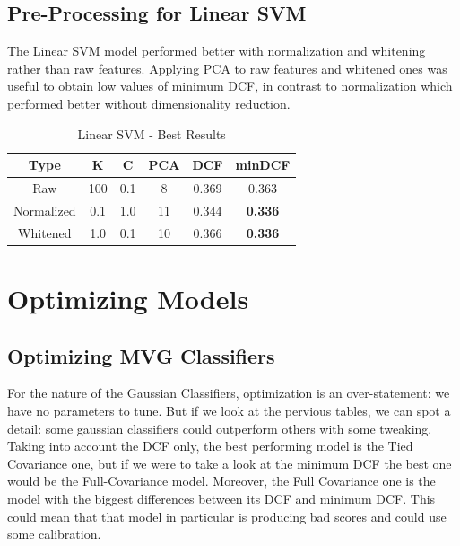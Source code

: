 \documentclass[12pt, twocolumn]{article}
\begin{document}
\subsection{Pre-Processing for Linear SVM}

The Linear SVM model performed better with normalization and whitening rather than raw features.
Applying PCA to raw features and whitened ones was useful to obtain low values of minimum DCF, in
contrast to normalization which performed better without dimensionality reduction.

\begin{table}[H]
    \centering
        \begin{tabular}{||c|c|c|c|c|c||}
            \hline
            Type & K & C & PCA & DCF & minDCF \\
            \hline
            \hline
            Raw & 100 & 0.1 & 8 & 0.369 &  0.363  \\
            Normalized & 0.1 & 1.0 & 11 & 0.344 &  {\bf 0.336}  \\
            Whitened & 1.0 & 0.1 & 10 & 0.366 &  {\bf 0.336}  \\
            \hline
    \end{tabular}
    \caption{Linear SVM - Best Results}
\end{table}

\section{Optimizing Models}
\subsection{Optimizing MVG Classifiers}

For the nature of the Gaussian Classifiers, optimization is an over-statement: we have no parameters to tune. 
But if we look at the pervious tables, we can spot a detail: some gaussian classifiers could outperform others with some tweaking.
Taking into account the DCF only, the best performing model is the Tied Covariance one, but if we were to take a look at the minimum DCF the best one would be the Full-Covariance model.
Moreover, the Full Covariance one is the model with the biggest differences between its DCF and minimum DCF.
This could mean that that model in particular is producing bad scores and could use some calibration.
\end{document}
